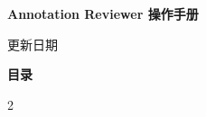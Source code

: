 \documentclass[UTF8,a4paper,zihao=5,fontset=none,twoside,openany]{ctexrep}
\begin{document}
\thispagestyle{plain}
\hypertarget{manual-contents}{}
\begingroup
\setlength{\parskip}{0pt}
\setlength{\multicolsep}{0pt}
{\centering\rmfamily\headingfont\bfseries\fontsize{22}{26}\selectfont\color{accent} Annotation Reviewer 操作手册\par}
{\centering\small 更新日期 \ManualDate\par}
\vspace{3pt}
{\rmfamily\headingfont\fontsize{12}{14.4}\selectfont\bfseries 目录\par}
\begin{multicols}{2}
\manualtoc
\end{multicols}
\endgroup
\cleardoublepage
{}

\end{document}
